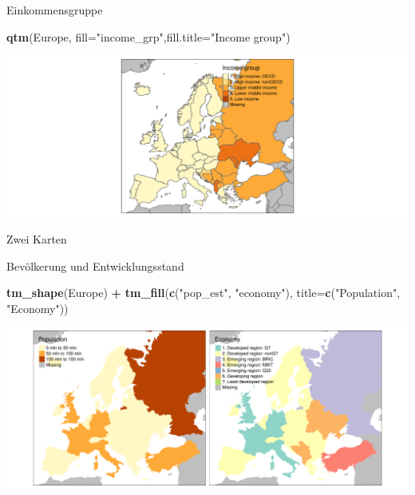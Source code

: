 \documentclass[ignorenonframetext,]{beamer}
\newenvironment{Shaded}{\begin{snugshade}}{\end{snugshade}}
\newcommand{\DataTypeTok}[1]{\textcolor[rgb]{0.13,0.29,0.53}{#1}}
\newcommand{\KeywordTok}[1]{\textcolor[rgb]{0.13,0.29,0.53}{\textbf{#1}}}
\newcommand{\NormalTok}[1]{#1}
\newcommand{\OperatorTok}[1]{\textcolor[rgb]{0.81,0.36,0.00}{\textbf{#1}}}
\newcommand{\StringTok}[1]{\textcolor[rgb]{0.31,0.60,0.02}{#1}}
\begin{document}
\begin{frame}[fragile]{Einkommensgruppe}
\protect\hypertarget{einkommensgruppe}{}

\begin{Shaded}
\begin{Highlighting}[]
\KeywordTok{qtm}\NormalTok{(Europe, }\DataTypeTok{fill=}\StringTok{"income_grp"}\NormalTok{,}\DataTypeTok{fill.title=}\StringTok{"Income group"}\NormalTok{) }
\end{Highlighting}
\end{Shaded}

\includegraphics{A4_tmap_files/figure-beamer/unnamed-chunk-21-1.pdf}

\end{frame}

\begin{frame}[fragile]{Zwei Karten}
\protect\hypertarget{zwei-karten}{}

\begin{block}{Bevölkerung und Entwicklungsstand}

\begin{Shaded}
\begin{Highlighting}[]
\KeywordTok{tm_shape}\NormalTok{(Europe) }\OperatorTok{+}
\StringTok{    }\KeywordTok{tm_fill}\NormalTok{(}\KeywordTok{c}\NormalTok{(}\StringTok{"pop_est"}\NormalTok{, }\StringTok{"economy"}\NormalTok{), }
        \DataTypeTok{title=}\KeywordTok{c}\NormalTok{(}\StringTok{"Population"}\NormalTok{, }\StringTok{"Economy"}\NormalTok{))}
\end{Highlighting}
\end{Shaded}

\includegraphics{A4_tmap_files/figure-beamer/unnamed-chunk-22-1.pdf}

\end{block}

\end{frame}
\end{document}
